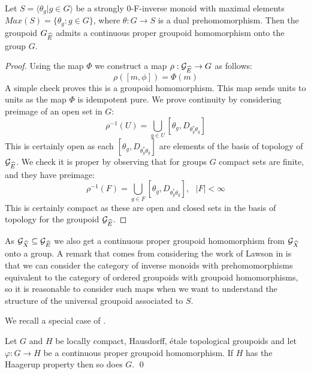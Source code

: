 \begin{conjecture}
\begin{proposition}\label{Prop:GrpoidHom}
Let $S = \langle \theta_{g} | g \in G \rangle$ be a strongly 0-F-inverse monoid with maximal elements $Max(S)= \lbrace \theta_{g}:g \in G \rbrace$, where $\theta: G \rightarrow S$ is a dual prehomomorphism. Then the groupoid $G_{\widehat{E}}$ admits a continuous proper groupoid homomorphism onto the group $G$.
\end{proposition}
\begin{proof}
Using the map $\Phi$ we construct a map $\rho: \mathcal{G}_{\widehat{E}} \rightarrow G$ as follows:
\begin{equation*}
\rho([m,\phi]) = \Phi(m)
\end{equation*}
A simple check proves this is a groupoid homomorphism. This map sends units to units as the map $\Phi$ is idempotent pure. We prove continuity by considering preimage of an open set in $G$:
\begin{equation*}
\rho^{-1}(U)=\bigcup_{g \in U}[\theta_{g},D_{\theta^{*}_{g}\theta_{g}}]
\end{equation*}
This is certainly open as each $[\theta_{g},D_{\theta^{*}_{g}\theta_{g}}]$ are elements of the basis of topology of $\mathcal{G}_{\widehat{E}}$. We check it is proper by observing that for groups $G$ compact sets are finite, and they have preimage:
\begin{equation*}
\rho^{-1}(F)=\bigcup_{g \in F}[\theta_{g},D_{\theta^{*}_{g}\theta_{g}}], \mbox{ } \vert F \vert < \infty 
\end{equation*}
This is certainly compact as these are open and closed sets in the basis of topology for the groupoid $\mathcal{G}_{\widehat{E}}$.\end{proof}

As $\mathcal{G}_{\widehat{X}} \subseteq \mathcal{G}_{\widehat{E}}$ we also get a continuous proper groupoid homomorphism from $\mathcal{G}_{\widehat{X}}$ onto a group.  A remark that comes from considering the work of Lawson in \cite{MR1694900} is that we can consider the category of inverse monoids with prehomomorphisms equivalent to the category of ordered groupoids with groupoid homomorphisms, so it is reasonable to consider such maps when we want to understand the structure of the universal groupoid associated to $S$. 

We recall a special case of \cite[Lemme 3.12]{MR1703305}.

\begin{lemma}\label{Lem:Lemme}
Let $G$ and $H$ be locally compact, Hausdorff, \'etale topological groupoids and let $\varphi: G \rightarrow H$ be a continuous proper groupoid homomorphism. If $H$ has the Haagerup property then so does $G$. \qed
\end{lemma}


\end{conjecture}
